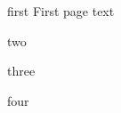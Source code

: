 \documentclass[greennotebook]{Silversiders} %
\begin{document}
\startnotebook{\nDeathGreenTwo{}}

\begin{page}{first}
First page text
\end{page}

\begin{page}{two}

\end{page}

\begin{page}{three}

\end{page}

\begin{page}{four}

\end{page}

\endnotebook
\end{document}
